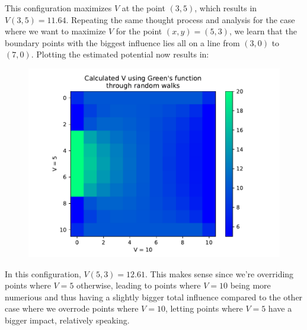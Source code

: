 \documentclass[a4paper,12pt]{article}
\begin{document}
\FloatBarrier

This configuration maximizes $V$ at the point $(3, 5)$, which results in $V(3, 5) = 11.64$. Repeating the same thought
process and analysis for the case where we want to maximize $V$ for the point $(x, y) = (5, 3)$, we learn that the
boundary points with the biggest influence lies all on a line from $(3, 0)$ to $(7, 0)$. Plotting the estimated
potential now results in:

\begin{figure}[!ht]
  \centering
  \includegraphics[scale=0.49]{img/4_4b_2_VfromG.pdf}
\end{figure}

In this configuration, $V(5, 3) = 12.61$. This makes sense since we're overriding points where $V = 5$ otherwise,
leading to points where $V = 10$ being more numerious and thus having a slightly bigger total influence compared to
the other case where we overrode points where $V = 10$, letting points where $V = 5$ have a bigger impact, relatively
speaking.
\end{document}
